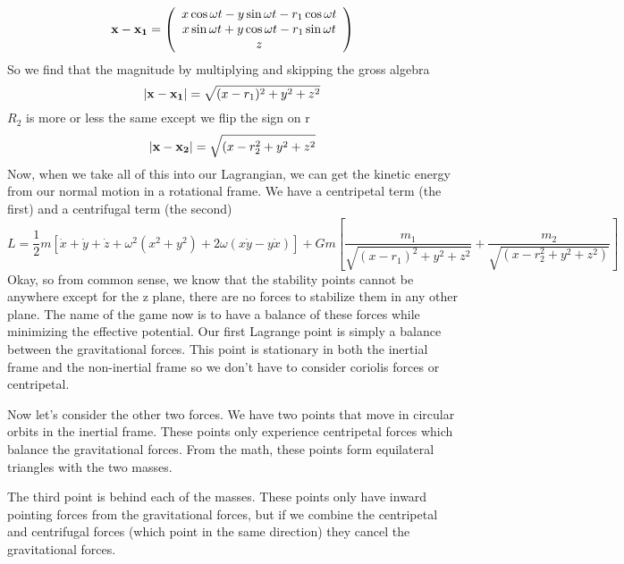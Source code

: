\begin{equation}
\mathbf{x} - \mathbf{x_1} =\left( \begin{array}{c} x\cos\omega t - y\sin \omega
t - r_1 \cos\omega t \\
x \sin \omega t + y \cos \omega t - r_1 \sin\omega t \\z\end{array} \right)
\end{equation}
So we find that the magnitude by multiplying and skipping the gross algebra
\begin{equation}
|\mathbf{x} - \mathbf{x_1}| = \sqrt{(x - r_1)^2 + y^2 + z^2}
\end{equation}
$R_2$ is more or less the same except we flip the sign on r
\begin{equation}
|\mathbf{x} - \mathbf{x_2}| = \sqrt{(x - r_2^2 + y^2 + z^2}
\end{equation}
Now, when we take all of this into our Lagrangian, we can get the
kinetic energy from our normal motion in a rotational frame. We have a
centripetal term (the first) and a centrifugal term (the second)
\begin{equation}
L = \frac{1}{2} m [ \dot{x} + \dot{y} + \dot{z} + \omega^2 (x^2 +
y^2)+ 2\omega (x\dot{y} - y\dot{x})] + Gm [\frac{m_1}{\sqrt{(x -
r_1)^2 + y^2 + z^2}} + \frac{m_2}{\sqrt{(x - r_2^2 + y^2 + z^2)}}]
\end{equation}
Okay, so from common sense, we know that the stability points cannot
be anywhere except for the z plane, there are no forces to stabilize
them in any other plane. The name of the game now is to have a balance
of these forces while minimizing the effective potential. Our first
Lagrange point is simply a balance between the gravitational
forces. This point is stationary in both the inertial frame and the
non-inertial frame so we don't have to consider coriolis forces or
centripetal. 

Now let's consider the other two forces. We have two points that move
in circular orbits in the inertial frame. These points only experience
centripetal forces which balance the gravitational forces. From the
math, these points form equilateral triangles with the two masses. 

The third point is behind each of the masses. These
points only have inward pointing forces from the gravitational forces,
but if we combine the centripetal and centrifugal forces (which point
in the same direction) they cancel the gravitational forces. 


